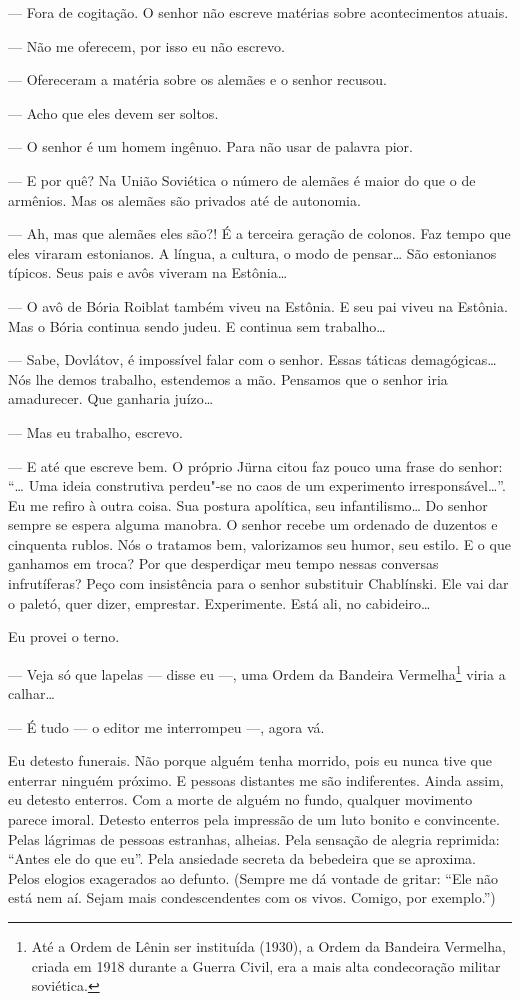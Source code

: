 --- Fora de cogitação. O senhor não escreve matérias sobre
acontecimentos atuais.

--- Não me oferecem, por isso eu não escrevo.

--- Ofereceram a matéria sobre os alemães e o senhor recusou.

--- Acho que eles devem ser soltos.

--- O senhor é um homem ingênuo. Para não usar de palavra pior.

--- E por quê? Na União Soviética o número de alemães é maior do que o
de armênios. Mas os alemães são privados até de autonomia.

--- Ah, mas que alemães eles são?! É a terceira geração de colonos. Faz
tempo que eles viraram estonianos. A língua, a cultura, o modo de
pensar\ldots{} São estonianos típicos. Seus pais e avôs viveram na Estônia\ldots{}

--- O avô de Bória Roiblat também viveu na Estônia. E seu pai viveu na
Estônia. Mas o Bória continua sendo judeu. E continua sem trabalho\ldots{}

--- Sabe, Dovlátov, é impossível falar com o senhor. Essas táticas
demagógicas\ldots{} Nós lhe demos trabalho, estendemos a mão. Pensamos que o
senhor iria amadurecer. Que ganharia juízo\ldots{}

--- Mas eu trabalho, escrevo.

--- E até que escreve bem. O próprio Jürna citou faz pouco uma frase do
senhor: ``\ldots{} Uma ideia construtiva perdeu"-se no caos de um experimento
irresponsável\ldots{}''. Eu me refiro à outra coisa. Sua postura apolítica,
seu infantilismo\ldots{} Do senhor sempre se espera alguma manobra. O senhor
recebe um ordenado de duzentos e cinquenta rublos. Nós o tratamos bem,
valorizamos seu humor, seu estilo. E o que ganhamos em troca? Por que
desperdiçar meu tempo nessas conversas infrutíferas? Peço com
insistência para o senhor substituir Chablínski. Ele vai dar o paletó,
quer dizer, emprestar. Experimente. Está ali, no cabideiro\ldots{}

Eu provei o terno.

--- Veja só que lapelas --- disse eu ---, uma Ordem da Bandeira
Vermelha\footnote{Até a Ordem de Lênin ser instituída (1930), a Ordem da
  Bandeira Vermelha, criada em 1918 durante a Guerra Civil, era a mais
  alta condecoração militar soviética.} viria a calhar\ldots{}

--- É tudo --- o editor me interrompeu ---, agora vá.

Eu detesto funerais. Não porque alguém tenha morrido, pois eu nunca tive
que enterrar ninguém próximo. E pessoas distantes me são indiferentes.
Ainda assim, eu detesto enterros. Com a morte de alguém no fundo,
qualquer movimento parece imoral. Detesto enterros pela impressão de um
luto bonito e convincente. Pelas lágrimas de pessoas estranhas, alheias.
Pela sensação de alegria reprimida: ``Antes ele do que eu''. Pela
ansiedade secreta da bebedeira que se aproxima. Pelos elogios exagerados
ao defunto. (Sempre me dá vontade de gritar: ``Ele não está nem aí.
Sejam mais condescendentes com os vivos. Comigo, por exemplo.'')

